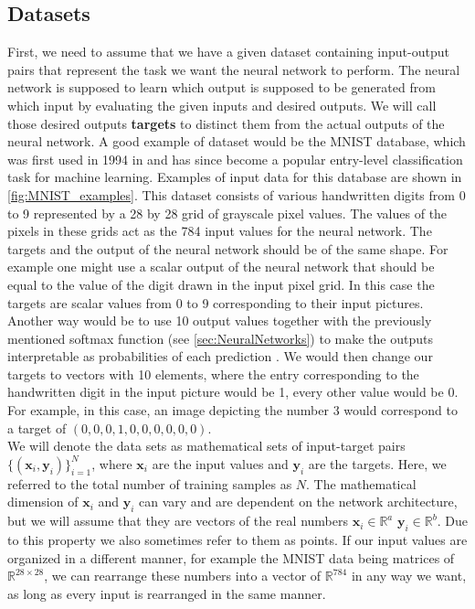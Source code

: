 \subsection{Datasets}\label{sec:Datasets}
First, we need to assume that we have a given dataset containing input-output pairs that represent the task we want the neural network to perform. The neural network is supposed to learn which output is supposed to be generated from which input by evaluating the given inputs and desired outputs. We will call those desired outputs \textbf{targets} to distinct them from the actual outputs of the neural network. A good example of dataset would be the MNIST database, which was first used in 1994 in \cite{firstMNISTpaper} and has since become a popular entry-level classification task for machine learning. Examples of input data for this database are shown in \cref{fig:MNIST_examples}. 
This dataset consists of various handwritten digits from 0 to 9 represented by a 28 by 28 grid of grayscale pixel values. The values of the pixels in these grids act as the 784 input values for the neural network. The targets and the output of the neural network should be of the same shape. For example one might use a scalar output of the neural network that should be equal to the value of the digit drawn in the input pixel grid. In this case the targets are scalar values from 0 to 9 corresponding to their input pictures. Another way would be to use 10 output values together with the previously mentioned softmax function (see \cref{sec:NeuralNetworks}) to make the outputs interpretable as probabilities of each prediction \cite{gao2018properties}. We would then change our targets to vectors with 10 elements, where the entry corresponding to the handwritten digit in the input picture would be 1, every other value would be 0. For example, in this case, an image depicting the number 3 would correspond to a target of $(0,0,0,1,0,0,0,0,0,0)$.\\
We will denote the data sets as mathematical sets of input-target pairs $\{(\mathbf{x}_i, \mathbf{y}_i)\}_{i=1}^N$, where $\mathbf{x}_i$ are the input values and $\mathbf{y}_i$ are the targets. Here, we referred to the total number of training samples as $N$. The mathematical dimension of $\mathbf{x}_i$ and $\mathbf{y}_i$ can vary and are dependent on the network architecture, but we will assume that they are vectors of the real numbers $\mathbf{x}_i \in \mathbb{R}^a$ $\mathbf{y}_i \in \mathbb{R}^b$. Due to this property we also sometimes refer to them as points. If our input values are organized in a different manner, for example the MNIST data being matrices of $\mathbb{R}^{28\times28}$, we can rearrange these numbers into a vector of $\mathbb{R}^{784}$ in any way we want, as long as every input is rearranged in the same manner.\\
